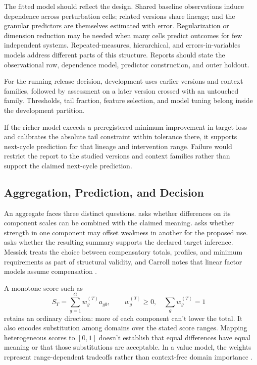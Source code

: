\documentclass[12pt]{article}
\begin{document}
The fitted model should reflect the design. Shared baseline observations induce dependence across perturbation cells; related versions share lineage; and the granular predictors are themselves estimated with error. Regularization or dimension reduction may be needed when many cells predict outcomes for few independent systems. Repeated-measures, hierarchical, and errors-in-variables models address different parts of this structure. Reports should state the observational row, dependence model, predictor construction, and outer holdout.

For the running release decision, development uses earlier versions and context families, followed by assessment on a later version crossed with an untouched family. Thresholds, tail fraction, feature selection, and model tuning belong inside the development partition.

If the richer model exceeds a preregistered minimum improvement in target loss and calibrates the absolute tail constraint within tolerance there, it supports next-cycle prediction for that lineage and intervention range. Failure would restrict the report to the studied versions and context families rather than support the claimed next-cycle prediction.

\subsection{Aggregation, Prediction, and Decision}\label{ssec:score_model}

An aggregate faces three distinct questions.  asks whether differences on its component scales can be combined with the claimed meaning.  asks whether strength in one component may offset weakness in another for the proposed use.  asks whether the resulting summary supports the declared target inference. Messick treats the choice between compensatory totals, profiles, and minimum requirements as part of structural validity, and Carroll notes that linear factor models assume compensation \cites[745--747]{messick1995Validity}[632]{carroll1993human}.

A monotone score such as
\[
S_T=\sum_{g=1}^{G}w_g^{(T)}a_{g0},
\qquad
w_g^{(T)}\geq0,\quad \sum_gw_g^{(T)}=1
\]
retains an ordinary direction: more of each component can't lower the total. It also encodes substitution among domains over the stated score ranges. Mapping heterogeneous scores to \([0,1]\) doesn't establish that equal differences have equal meaning or that those substitutions are acceptable. In a value model, the weights represent range-dependent tradeoffs rather than context-free domain importance \citep{KeeneyRaiffa1993}.
\end{document}
